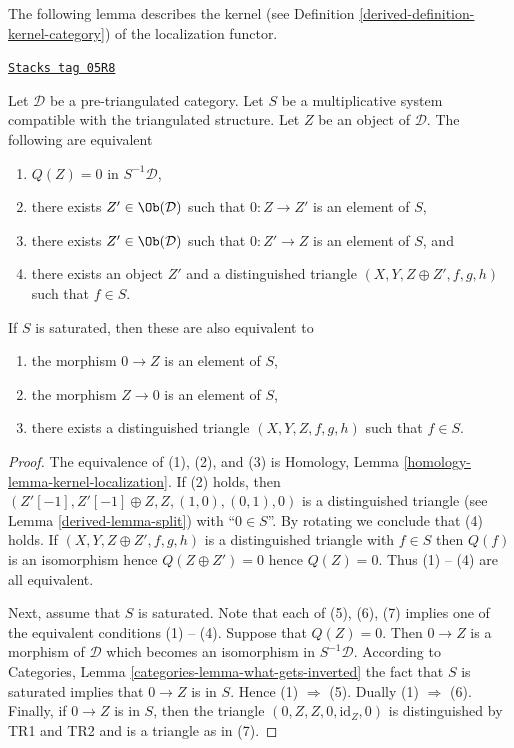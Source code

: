 The following lemma describes the kernel (see
Definition \ref{derived-definition-kernel-category})
of the localization functor.

\begin{lemma}
\label{derived-lemma-kernel-localization}
\href{https://stacks.math.columbia.edu/tag/05R8}{\texttt{Stacks tag 05R8}}

Let $\mathcal{D}$ be a pre-triangulated category. Let $S$ be a multiplicative
system compatible with the triangulated structure. Let $Z$ be an object
of $\mathcal{D}$. The following are equivalent
\begin{enumerate}
\item $Q(Z) = 0$ in $S^{-1}\mathcal{D}$,
\item there exists $Z' \in \Ob(\mathcal{D})$ such that
$0 : Z \to Z'$ is an element of $S$,
\item there exists $Z' \in \Ob(\mathcal{D})$ such that
$0 : Z' \to Z$ is an element of $S$, and
\item there exists an object $Z'$ and a distinguished triangle
$(X, Y, Z \oplus Z', f, g, h)$ such that $f \in S$.
\end{enumerate}
If $S$ is saturated, then these are also equivalent to
\begin{enumerate}
\item[(5)] the morphism $0 \to Z$ is an element of $S$,
\item[(6)] the morphism $Z \to 0$ is an element of $S$,
\item[(7)] there exists a distinguished triangle $(X, Y, Z, f, g, h)$
such that $f \in S$.
\end{enumerate}
\end{lemma}

\begin{proof}

The equivalence of (1), (2), and (3) is
Homology, Lemma \ref{homology-lemma-kernel-localization}.
If (2) holds, then $(Z'[-1], Z'[-1] \oplus Z, Z, (1, 0), (0, 1), 0)$
is a distinguished triangle (see
Lemma \ref{derived-lemma-split})
with ``$0 \in S$''. By rotating we conclude that (4) holds.
If $(X, Y, Z \oplus Z', f, g, h)$ is a distinguished triangle with $f \in S$
then $Q(f)$ is an isomorphism hence $Q(Z \oplus Z') = 0$ hence $Q(Z) = 0$.
Thus (1) -- (4) are all equivalent.

\medskip\noindent
Next, assume that $S$ is saturated. Note that each of (5), (6), (7)
implies one of the equivalent conditions (1) -- (4). Suppose that
$Q(Z) = 0$. Then $0 \to Z$ is a morphism of $\mathcal{D}$ which becomes
an isomorphism in $S^{-1}\mathcal{D}$. According to
Categories, Lemma \ref{categories-lemma-what-gets-inverted}
the fact that $S$ is saturated implies that $0 \to Z$ is in $S$.
Hence (1) $\Rightarrow$ (5). Dually (1) $\Rightarrow$ (6).
Finally, if $0 \to Z$ is in $S$, then the triangle
$(0, Z, Z, 0, \text{id}_Z, 0)$ is distinguished by TR1 and TR2 and
is a triangle as in (7).
\end{proof}

